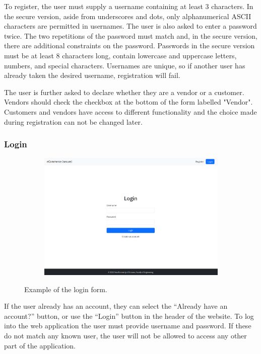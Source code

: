 \documentclass[conference,onecolumn,a4paper]{IEEEtran}
\begin{document}
To register, the user must supply a username containing at least 3 characters. In the secure version, aside from underscores and dots, only alphanumerical ASCII characters are permitted in usernames. The user is also asked to enter a password twice. The two repetitions of the password must match and, in the secure version, there are additional constraints on the password. Passwords in the secure version must be at least 8 characters long, contain lowercase and uppercase letters, numbers, and special characters. Usernames are unique, so if another user has already taken the desired username, registration will fail.

The user is further asked to declare whether they are a vendor or a customer. Vendors should check the checkbox at the bottom of the form labelled "Vendor". Customers and vendors have access to different functionality and the choice made during registration can not be changed later.

\subsubsection{Login}

\begin{figure}[H]
    \centering
    \begin{subfigure}[b]{0.4\linewidth}
        \includegraphics[width=\linewidth]{resources/login.png}
    \end{subfigure}
    \caption{Example of the login form.}
\end{figure}

If the user already has an account, they can select the “Already have an account?” button, or use the “Login” button in the header of the website. To log into the web application the user must provide username and password. If these do not match any known user, the user will not be allowed to access any other part of the application.
\end{document}
